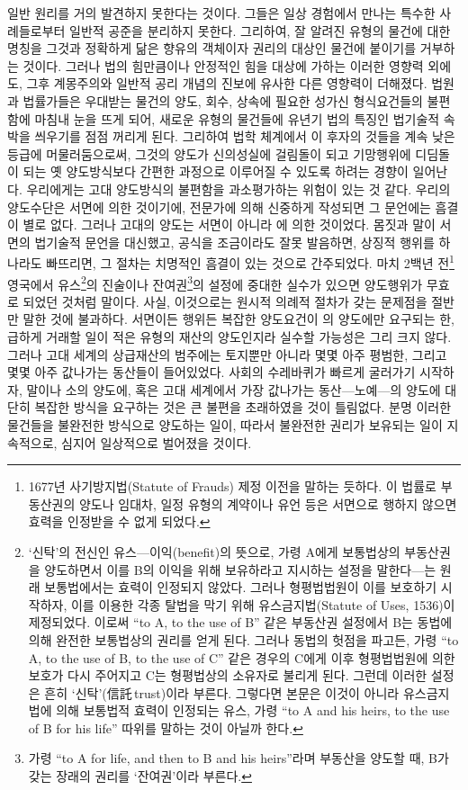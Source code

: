 일반 원리를 거의 발견하지 못한다는 것이다.
그들은 일상 경험에서 만나는 특수한 사례들로부터
일반적 공준을 분리하지 못한다.
그리하여,
잘 알려진 유형의 물건에 대한 명칭을
그것과 정확하게 닮은 향유의 객체이자 권리의 대상인 물건에
붙이기를 거부하는 것이다.
그러나
법의 힘만큼이나 안정적인 힘을 대상에 가하는
이러한 영향력 외에도,
그후
계몽주의와 일반적 공리 개념의 진보에 유사한
다른 영향력이 더해졌다.
법원과 법률가들은
우대받는 물건의 양도, 회수, 상속에 필요한 성가신 형식요건들의
불편함에 마침내 눈을 뜨게 되어,
새로운 유형의 물건들에
유년기 법의 특징인 법기술적 속박을 씌우기를 점점 꺼리게 된다.
그리하여
법학 체계에서
이 후자의 것들을 계속 낮은 등급에 머물러둠으로써,
그것의 양도가
신의성실에 걸림돌이 되고 기망행위에 디딤돌이 되는
옛 양도방식보다 간편한 과정으로 이루어질 수 있도록
하려는 경향이 일어난다.
우리에게는 고대 양도방식의 불편함을 과소평가하는 위험이 있는 것 같다.
우리의 양도수단은 서면에 의한 것이기에,
전문가에 의해 신중하게 작성되면 그 문언에는 흠결이 별로 없다.
그러나 고대의 양도는 서면이 아니라 에 의한 것이었다.
몸짓과 말이 서면의 법기술적 문언을 대신했고,
공식을 조금이라도 잘못 발음하면,
상징적 행위를 하나라도 빠뜨리면,
그 절차는 치명적인 흠결이 있는 것으로 간주되었다.
마치 2백년 전\footnote{%
  1677년 사기방지법(Statute of Frauds) 제정 이전을 말하는 듯하다.
  이 법률로 부동산권의 양도나 임대차, 일정 유형의 계약이나 유언 등은
  서면으로 행하지 않으면 효력을 인정받을 수 없게 되었다.
  }
영국에서 유스\footnote{%
  `신탁'의 전신인 유스---이익(benefit)의 뜻으로,
  가령 A에게 보통법상의 부동산권을 양도하면서
  이를 B의 이익을 위해 보유하라고 지시하는 설정을 말한다---는 원래 보통법에서는
  효력이 인정되지 않았다. 그러나 형평법법원이 이를 보호하기 시작하자,
  이를 이용한 각종 탈법을 막기 위해
  유스금지법(Statute of Uses, 1536)이 제정되었다. 이로써
  ``to A, to the use of B'' 같은 부동산권 설정에서 B는 동법에 의해
  완전한 보통법상의 권리를 얻게 된다.
  그러나 동법의 헛점을 파고든, 가령
  ``to A, to the use of B, to the use of C'' 같은 경우의 C에게
  이후 형평법법원에 의한 보호가 다시 주어지고
  C는 형평법상의 소유자로 불리게 된다.
  그런데 이러한 설정은 흔히 `신탁'(信託\,trust)이라 부른다.
  그렇다면 본문은 이것이 아니라 유스금지법에 의해 보통법적 효력이
  인정되는 유스, 가령
  ``to A and his heirs, to the use of B for his life'' 따위를
  말하는 것이 아닐까 한다.
}의 진술이나
잔여권\footnote{%
  가령 ``to A for life, and then to B and his heirs''라며
  부동산을 양도할 때,
  B가 갖는 장래의 권리를 `잔여권'이라 부른다.
}의 설정에
중대한 실수가 있으면 양도행위가 무효로 되었던 것처럼 말이다.
사실, 이것으로는 원시적 의례적 절차가 갖는 문제점을 절반만 말한 것에 불과하다.
서면이든 행위든 복잡한 양도요건이 의 양도에만 요구되는 한,
급하게 거래할 일이 적은 유형의 재산의 양도인지라
실수할 가능성은 그리 크지 않다.
그러나 고대 세계의 상급재산의 범주에는
토지뿐만 아니라 몇몇 아주 평범한, 그리고 몇몇 아주 값나가는 동산들이
들어있었다.
사회의 수레바퀴가 빠르게 굴러가기 시작하자,
말이나 소의 양도에, 혹은
고대 세계에서 가장 값나가는 동산---노예---의
양도에 대단히 복잡한 방식을 요구하는 것은
큰 불편을 초래하였을 것이 틀림없다.
분명
이러한 물건들을 불완전한 방식으로 양도하는 일이,
따라서 불완전한 권리가 보유되는 일이
지속적으로, 심지어 일상적으로 벌어졌을 것이다.

